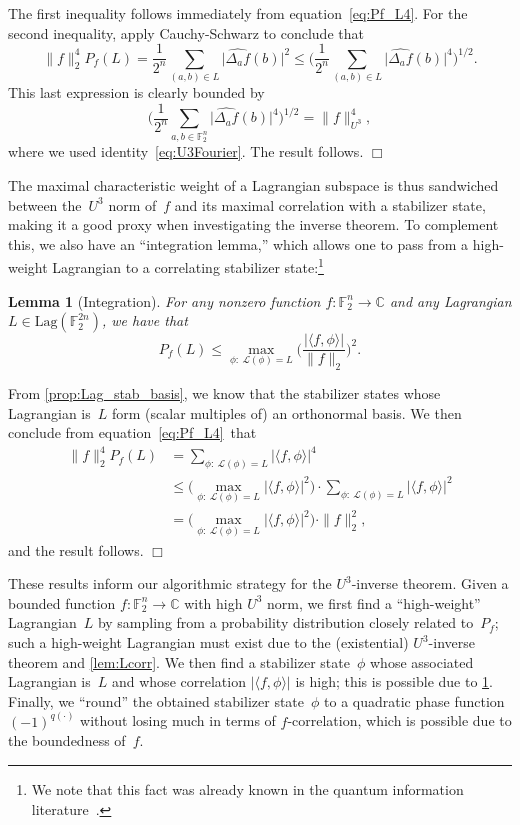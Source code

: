 \documentclass[11pt]{amsart}
\newcommand{\Lag}{\mathrm{Lag}}
\newcommand{\C}{\mathbb{C}} %
\newcommand{\F}{\mathbb{F}} %
\newcommand{\Lcal}{\mathcal{L}}
\theoremstyle{plain}
\newtheorem{lemma}[theorem]{Lemma}
\theoremstyle{definition}
\theoremstyle{remark}
\renewenvironment{proof}[1][]{
    	\begin{trivlist}
     	\item[\hspace{\labelsep}{\em\noindent Proof#1:\/}]}
     	{{\hfill$\Box$}
    	\end{trivlist}
  }
\begin{document}
\begin{proof}
The first inequality follows immediately from equation~\eqref{eq:Pf_L4}.
For the second inequality, apply Cauchy-Schwarz to conclude that
$$\|f\|_2^4 P_f(L) = \frac{1}{2^n} \sum_{(a,b) \in L} \big|\widehat{\Delta_af}(b)\big|^2 \leq \bigg(\frac{1}{2^n} \sum_{(a,b) \in L} \big|\widehat{\Delta_af}(b)\big|^4 \bigg)^{1/2}.$$
This last expression is clearly bounded by
$$\bigg(\frac{1}{2^n} \sum_{a,b \in \F_2^n} \big|\widehat{\Delta_af}(b)\big|^4 \bigg)^{1/2} = \|f\|_{U^3}^4,$$
where we used identity~\eqref{eq:U3Fourier}.
The result follows.
\end{proof}

The maximal characteristic weight of a Lagrangian subspace is thus sandwiched between the~$U^3$ norm of~$f$ and its maximal correlation with a stabilizer state, making it a good proxy when investigating the inverse theorem.
To complement this, we also have an ``integration lemma,'' which allows one to pass from a high-weight Lagrangian to a correlating stabilizer state:\footnote{We note that this fact was already known in the quantum information literature~\cite{Gross2021}.}

\begin{lemma}[Integration] \label{lem:integration}
    For any nonzero function $f:\F_2^n\to \C$ and any Lagrangian $L\in \Lag(\F_2^{2n})$, we have that
    $$P_f(L) \leq \max_{\phi:\: \Lcal(\phi)=L} \bigg(\frac{|\langle f, \phi\rangle|}{\|f\|_2}\bigg)^2.$$
\end{lemma}

\begin{proof}
From \cref{prop:Lag_stab_basis}, we know that the stabilizer states whose Lagrangian is~$L$ form (scalar multiples of) an orthonormal basis.
We then conclude from equation~\eqref{eq:Pf_L4}~that
\begin{align*}
    \|f\|_2^4 P_f(L)
    &= \sum_{\phi:\: \Lcal(\phi)=L} |\langle f, \phi\rangle|^4 \\
    &\leq \Big(\max_{\phi:\: \Lcal(\phi)=L} |\langle f, \phi\rangle|^2\Big) \cdot \sum_{\phi:\: \Lcal(\phi)=L} |\langle f, \phi\rangle|^2 \\
    &= \Big(\max_{\phi:\: \Lcal(\phi)=L} |\langle f, \phi\rangle|^2\Big) \cdot \|f\|_2^2,
\end{align*}
and the result follows.
\end{proof}

These results inform our algorithmic strategy for the $U^3$-inverse theorem.
Given a bounded function $f: \F_2^n \to \C$ with high $U^3$ norm, we first find a ``high-weight'' Lagrangian~$L$ by sampling from a probability distribution closely related to~$P_f$;
such a high-weight Lagrangian must exist due to the (existential) $U^3$-inverse theorem and \cref{lem:Lcorr}.
We then find a stabilizer state~$\phi$ whose associated Lagrangian is~$L$ and whose correlation $|\langle f, \phi\rangle|$ is high;
this is possible due to \cref{lem:integration}.
Finally, we ``round'' the obtained stabilizer state~$\phi$ to a quadratic phase function~$(-1)^{q(\cdot)}$ without losing much in terms of $f$-correlation, which is possible due to the boundedness of~$f$.
\end{document}
